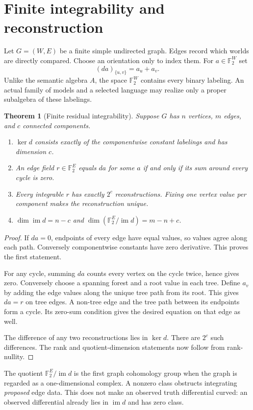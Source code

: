 \documentclass[11pt,letterpaper]{article}
\newtheorem{theorem}{Theorem}[section]
\theoremstyle{definition}
\newcommand{\F}{\mathbb F_2}
\newcommand{\im}{\operatorname{im}}
\begin{document}
\section{Finite integrability and reconstruction}\label{sec:graph}
Let $G=(W,E)$ be a finite simple undirected graph. Edges record which worlds are directly compared. Choose an orientation only to index them. For $a\in\F^W$ set
\[
(da)_{\{u,v\}}=a_u+a_v.
\]
Unlike the semantic algebra $A$, the space $\F^W$ contains every binary labeling. An actual family of models and a selected language may realize only a proper subalgebra of these labelings.

\begin{theorem}[Finite residual integrability]\label{thm:integrability}
Suppose $G$ has $n$ vertices, $m$ edges, and $c$ connected components.
\begin{enumerate}
\item $\ker d$ consists exactly of the componentwise constant labelings and has dimension $c$.
\item An edge field $r\in\F^E$ equals $da$ for some $a$ if and only if its sum around every cycle is zero.
\item Every integrable $r$ has exactly $2^c$ reconstructions. Fixing one vertex value per component makes the reconstruction unique.
\item $\dim\im d=n-c$ and $\dim(\F^E/\im d)=m-n+c$.
\end{enumerate}
\end{theorem}
\begin{proof}
If $da=0$, endpoints of every edge have equal values, so values agree along each path. Conversely componentwise constants have zero derivative. This proves the first statement.

For any cycle, summing $da$ counts every vertex on the cycle twice, hence gives zero. Conversely choose a spanning forest and a root value in each tree. Define $a_v$ by adding the edge values along the unique tree path from its root. This gives $da=r$ on tree edges. A non-tree edge and the tree path between its endpoints form a cycle. Its zero-sum condition gives the desired equation on that edge as well.

The difference of any two reconstructions lies in $\ker d$. There are $2^c$ such differences. The rank and quotient-dimension statements now follow from rank-nullity.
\end{proof}

The quotient $\F^E/\im d$ is the first graph cohomology group when the graph is regarded as a one-dimensional complex. A nonzero class obstructs integrating \emph{proposed} edge data. This does not make an observed truth differential curved: an observed differential already lies in $\im d$ and has zero class.
\end{document}
